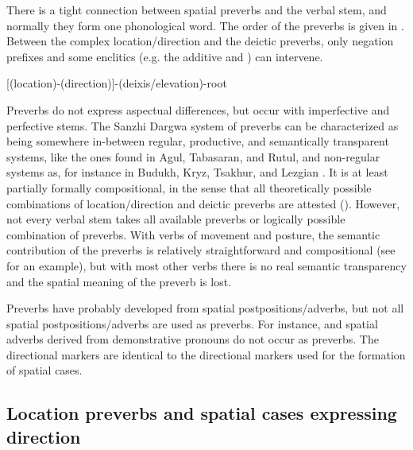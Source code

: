 There is a tight connection between spatial preverbs and the verbal stem, and normally they form one phonological word. The order of the preverbs is given in . Between the complex location/direction and the deictic preverbs, only negation prefixes and some enclitics (e.g. the additive  and  ) can intervene.
%
\begin{exe}
	\ex	\mbox{[(location)-(direction)]-(deixis/elevation)-root}	\label{ex:preverb affixation order}
\end{exe}

Preverbs do not express aspectual differences, but occur with imperfective and perfective stems. The Sanzhi Dargwa system of preverbs can be characterized as being somewhere in-between regular, productive, and semantically transparent systems, like the ones found in Agul, Tabasaran, and Rutul, and non-regular systems as, for instance in Budukh, Kryz, Tsakhur, and Lezgian \citep{Tatevosov2000, Nichols2003, Ganenkov2007}. It is at least partially formally compositional, in the sense that all theoretically possible combinations of location/direction and deictic preverbs are attested (). However, not every verbal stem takes all available preverbs or logically possible combination of preverbs. With verbs of movement and posture, the semantic contribution of the preverbs is relatively straightforward and compositional (see  for an example), but with most other verbs there is no real semantic transparency and the spatial meaning of the preverb is lost.

Preverbs have probably developed from spatial postpositions/adverbs, but not all spatial postpositions/adverbs are used as preverbs. For instance,   and spatial adverbs derived from demonstrative pronouns do not occur as preverbs. The directional markers are identical to the directional markers used for the formation of spatial cases.



\subsection{Location preverbs and spatial cases expressing direction}
\label{ssec:Location preverbs and spatial cases expressing direction}

